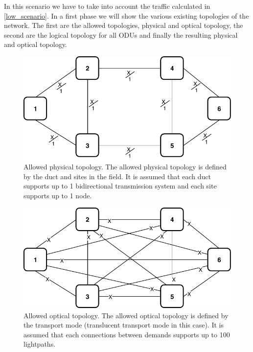 In this scenario we have to take into account the traffic calculated in \ref{low_scenario}. In a first phase we will show the various existing topologies of the network. The first are the allowed topologies, physical and optical topology, the second are the logical topology for all ODUs and finally the resulting physical and optical topology.\\

\newpage
\begin{figure}[h!]
\centering
\includegraphics[width=13cm]{sdf/ilp/translucent_protection/figures/allowed_physical_topology}
\caption{Allowed physical topology. The allowed physical topology is defined by the duct and sites in the field. It is assumed that each duct supports up to 1 bidirectional transmission system and each site supports up to 1 node.}
\label{allowed3_physical_protectionlow}
\end{figure}

\vspace{20pt}
\begin{figure}[h!]
\centering
\includegraphics[width=13cm]{sdf/ilp/translucent_protection/figures/allowed_optical_topology}
\caption{Allowed optical topology. The allowed optical topology is defined by the transport mode (translucent transport mode in this case). It is assumed that each connections between demands supports up to 100 lightpaths.}
\label{allowed3_optical_protectionlow}
\end{figure}

